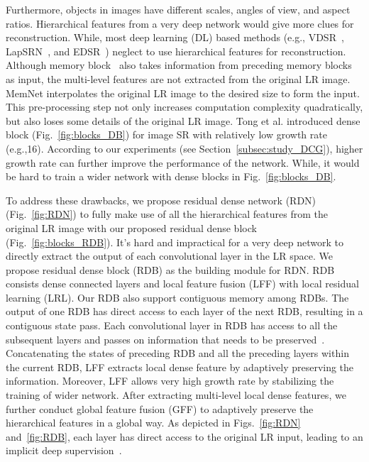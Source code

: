 \documentclass[10pt,twocolumn,letterpaper]{article}
\begin{document}
Furthermore, objects in images have different scales, angles of view, and aspect ratios. Hierarchical features from a very deep network would give more clues for reconstruction. While, most deep learning (DL) based methods (e.g., VDSR~\cite{kim2016accurate}, LapSRN~\cite{lai2017deep}, and EDSR~\cite{lim2017enhanced}) neglect to use hierarchical features for reconstruction. Although memory block~\cite{tai2017memnet} also takes information from preceding memory blocks as input, the multi-level features are not extracted from the original LR image. MemNet interpolates the original LR image to the desired size to form the input. This pre-processing step not only increases computation complexity quadratically, but also loses some details of the original LR image. Tong et al. introduced dense block (Fig.~\ref{fig:blocks_DB}) for image SR with relatively low growth rate (e.g.,16). According to our experiments (see Section~\ref{subsec:study_DCG}), higher growth rate can further improve the performance of the network. While, it would be hard to train a wider network with dense blocks in Fig.~\ref{fig:blocks_DB}. 

To address these drawbacks, we propose residual dense network (RDN) (Fig.~\ref{fig:RDN}) to fully make use of all the hierarchical features from the original LR image with our proposed residual dense block (Fig.~\ref{fig:blocks_RDB}). It's hard and impractical for a very deep network to directly extract the output of each convolutional layer in the LR space. We propose residual dense block (RDB) as the building module for RDN. RDB consists dense connected layers and local feature fusion (LFF) with local residual learning (LRL). Our RDB also support contiguous memory among RDBs. The output of one RDB has direct access to each layer of the next RDB, resulting in a contiguous state pass. Each convolutional layer in RDB has access to all the subsequent layers and passes on information that needs to be preserved~\cite{huang2017densely}. Concatenating the states of preceding RDB and all the preceding layers within the current RDB, LFF extracts local dense feature by adaptively preserving the information. Moreover, LFF allows very high growth rate by stabilizing the training of wider network. After extracting multi-level local dense features, we further conduct global feature fusion (GFF) to adaptively preserve the hierarchical features in a global way. As depicted in Figs.~\ref{fig:RDN} and~\ref{fig:RDB}, each layer has direct access to the original LR input, leading to an implicit deep supervision~\cite{lee2015deeply}.
\end{document}
